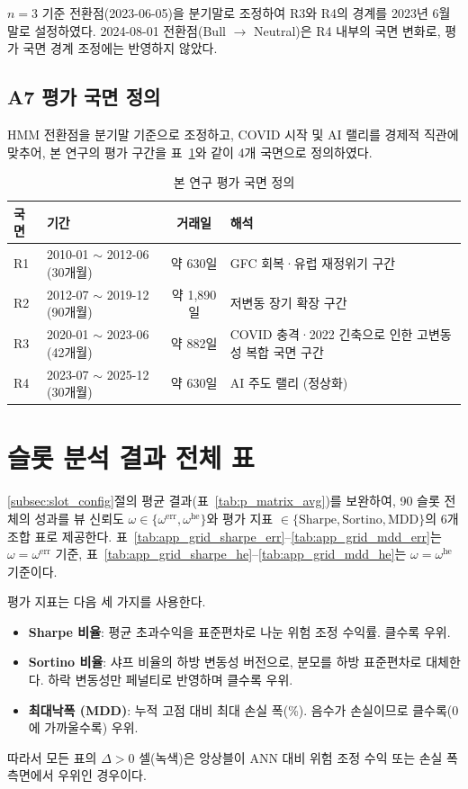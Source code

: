 \documentclass[eng]{kjas3}
\begin{document}
$n = 3$ 기준 전환점(2023-06-05)을 분기말로 조정하여 R3와 R4의 경계를 2023년 6월 말로 설정하였다. 2024-08-01 전환점(Bull $\rightarrow$ Neutral)은 R4 내부의 국면 변화로, 평가 국면 경계 조정에는 반영하지 않았다.

\subsection*{A7 평가 국면 정의}

HMM 전환점을 분기말 기준으로 조정하고, COVID 시작 및 AI 랠리를 경제적 직관에 맞추어, 본 연구의 평가 구간을 표~\ref{tab:a1_regimes}와 같이 4개 국면으로 정의하였다.

\begin{table}[t]
\centering
\caption{본 연구 평가 국면 정의}
\label{tab:a1_regimes}
\begin{tabular}{llcl}
\toprule
\textbf{국면} & \textbf{기간} & \textbf{거래일} & \textbf{해석} \\
\midrule
R1 & 2010-01 $\sim$ 2012-06 (30개월) & 약 630일   & GFC 회복·유럽 재정위기 구간 \\
R2 & 2012-07 $\sim$ 2019-12 (90개월) & 약 1,890일 & 저변동 장기 확장 구간 \\
R3 & 2020-01 $\sim$ 2023-06 (42개월) & 약 882일   & COVID 충격·2022 긴축으로 인한 고변동성 복합 국면 구간 \\
R4 & 2023-07 $\sim$ 2025-12 (30개월) & 약 630일   & AI 주도 랠리 (정상화) \\
\bottomrule
\end{tabular}
\end{table}

\section{슬롯 분석 결과 전체 표}\label{app:result_table}

\ref{subsec:slot_config}절의 평균 결과(표~\ref{tab:p_matrix_avg})를 보완하여, 90 슬롯 전체의 성과를 뷰 신뢰도 $\omega \in \{\omega^{\mathrm{err}}, \omega^{\mathrm{he}}\}$와 평가 지표 $\in \{\text{Sharpe}, \text{Sortino}, \text{MDD}\}$의 6개 조합 표로 제공한다. 표~\ref{tab:app_grid_sharpe_err}--\ref{tab:app_grid_mdd_err}는 $\omega = \omega^{\mathrm{err}}$ 기준, 표~\ref{tab:app_grid_sharpe_he}--\ref{tab:app_grid_mdd_he}는 $\omega = \omega^{\mathrm{he}}$ 기준이다.

평가 지표는 다음 세 가지를 사용한다.
\begin{itemize}
  \item \textbf{Sharpe 비율}: 평균 초과수익을 표준편차로 나눈 위험 조정 수익률. 클수록 우위.
  \item \textbf{Sortino 비율}: 샤프 비율의 하방 변동성 버전으로, 분모를 하방 표준편차로 대체한다\citep{sortino1994}. 하락 변동성만 페널티로 반영하며 클수록 우위.
  \item \textbf{최대낙폭 (MDD)}: 누적 고점 대비 최대 손실 폭(\%). 음수가 손실이므로 클수록(0 에 가까울수록) 우위.
\end{itemize}
따라서 모든 표의 $\Delta > 0$ 셀(녹색)은 앙상블이 ANN 대비 위험 조정 수익 또는 손실 폭 측면에서 우위인 경우이다.
\end{document}
